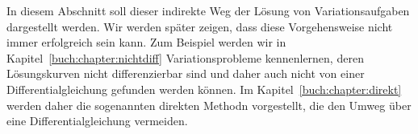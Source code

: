 In diesem Abschnitt soll dieser indirekte Weg der Lösung von
Variationsaufgaben dargestellt werden.
Wir werden später zeigen, dass diese Vorgehensweise nicht immer
erfolgreich sein kann.
Zum Beispiel werden wir in Kapitel~\ref{buch:chapter:nichtdiff}
Variationsprobleme kennenlernen, deren Lösungskurven nicht
differenzierbar sind und daher auch nicht von einer Differentialgleichung
gefunden werden können.
Im Kapitel~\ref{buch:chapter:direkt} werden daher die sogenannten
direkten Methodn vorgestellt, die den Umweg über eine
Differentialgleichung vermeiden.






